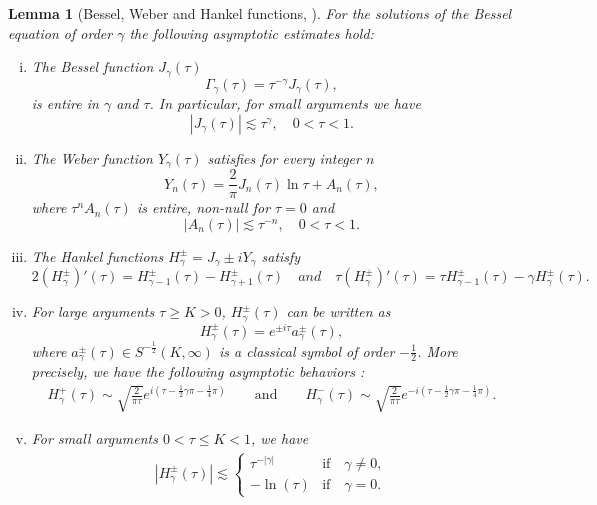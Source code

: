 \documentclass[10pt]{article}
\newtheorem{lemma}{Lemma}[section]
\newcommand{\<}{\langle}
\renewcommand{\>}{\rangle}
\numberwithin{equation}{section}
\begin{document}
\begin{lemma}[Bessel, Weber and Hankel functions, \cite{Bateman}] \label{hankel}
For the solutions of the Bessel equation of order $\gamma$ the following asymptotic estimates hold:
\begin{enumerate}[(i)]
\item The Bessel function $J_{\gamma}(\tau)$
\[ \Gamma_{\gamma}(\tau)=\tau^{-\gamma}J_{\gamma}(\tau),\]
is entire in $\gamma$ and $\tau$. In particular, for small arguments we have
\begin{equation*} \label{Besselest}
|J_{\gamma}(\tau)| \lesssim \tau^{\gamma}, \quad 0<\tau <1.
\end{equation*}
\item The Weber function $Y_{\gamma}(\tau)$ satisfies for every integer $n$
\[ Y_{n}(\tau)= \frac2{\pi}J_{n}(\tau)\ln\tau + A_n(\tau),\]
where $\tau^{n}A_{n}(\tau)$ is entire, non-null for $\tau=0$  and
\begin{equation*} \label{SecondBesselest}
|A_n(\tau)| \lesssim \tau^{-n}, \quad 0<\tau <1.
\end{equation*}
\item The Hankel functions $H^{\pm}_{\gamma}=J_{\gamma}\pm iY_{\gamma}$ satisfy
\[2(H^{\pm}_{\gamma})'(\tau)=H^{\pm}_{\gamma-1}(\tau)- H^{\pm}_{\gamma+1}(\tau) \quad  and \quad \tau (H^{\pm}_{\gamma})'(\tau)=\tau H^{\pm}_{\gamma-1}(\tau)-\gamma H^{\pm}_{\gamma}(\tau).\]
\item For large arguments $\tau\geq K>0$, $H^{\pm}_{\gamma}(\tau)$ can be written as
\begin{equation*}\label{HankelHigh}
H^{\pm}_{\gamma}(\tau)=e^{\pm i\tau} a_{\gamma}^{\pm}(\tau),
\end{equation*}
where $a_{\gamma}^{\pm}(\tau) \in S^{-\frac12}(K, \infty)$  is a classical symbol of order $-\frac12$.  More precisely, we have the following asymptotic behaviors \cite[Equations (10.2.5) and (10.2.6)]{Handbook=2010}:
\begin{align*}
H_{\gamma}^{+}(\tau) \sim \sqrt{\frac{2}{\pi \tau}}e^{i\left( \tau-\frac{1}{2}\gamma\pi-\frac{1}{4}\pi \right)} \qquad \text{and} \qquad H_{\gamma}^{-}(\tau) \sim \sqrt{\frac{2}{\pi \tau}}e^{-i\left(\tau-\frac{1}{2}\gamma\pi-\frac{1}{4}\pi \right)}.
\end{align*}
\item For small arguments $0<\tau\leq K <1$, we have
\begin{align*}\label{HankelLow}
|H^{\pm}_{\gamma}(\tau)|\lesssim
\begin{cases}
\tau^{-|\gamma|} & \text{if} \quad  \gamma\neq 0, \\
-\ln(\tau) & \text{if} \quad \gamma= 0.
\end{cases}
\end{align*}
\end{enumerate}
\end{lemma}
\end{document}
